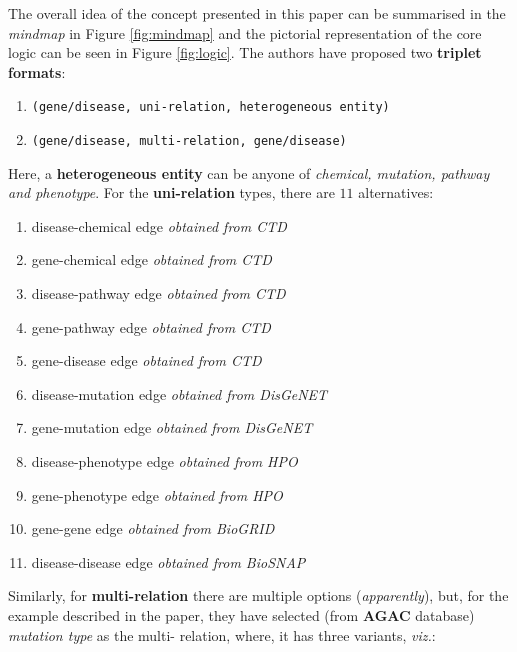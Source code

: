 \begin{sloppypar*}

    The overall idea of the concept presented in this paper can be summarised in
    the \textit{mindmap} in Figure \ref{fig:mindmap} and the pictorial representation of
    the core logic can be seen in Figure \ref{fig:logic}. The authors have proposed
    two \textbf{triplet formats}:
    
    \begin{enumerate}
        \item \verb|(gene/disease, uni-relation, heterogeneous entity)|
        \item \verb|(gene/disease, multi-relation, gene/disease)|
    \end{enumerate}
    
    \noindent Here, a \textbf{heterogeneous entity} can be anyone of \textit{chemical,
    mutation, pathway and phenotype}. For the \textbf{uni-relation} types, there
    are $11$ alternatives:
    \begin{enumerate}
        \item disease-chemical edge \textit{obtained from CTD}
        \item gene-chemical edge \textit{obtained from CTD}
        \item disease-pathway edge \textit{obtained from CTD}
        \item gene-pathway edge \textit{obtained from CTD}
        \item gene-disease edge \textit{obtained from CTD}
        \item disease-mutation edge \textit{obtained from DisGeNET}
        \item gene-mutation edge \textit{obtained from DisGeNET}
        \item disease-phenotype edge \textit{obtained from HPO}
        \item gene-phenotype edge \textit{obtained from HPO}
        \item gene-gene edge \textit{obtained from BioGRID}
        \item disease-disease edge \textit{obtained from BioSNAP}
    \end{enumerate}
    
    \noindent Similarly, for \textbf{multi-relation} there are multiple options
    (\textit{apparently}), but, for the example described in the paper, they have
    selected (from \textbf{AGAC} database) \textit{mutation type} as the multi-
    relation, where, it has three variants, \textit{viz.}:
    

\end{sloppypar*}
